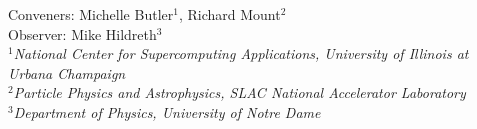 \begin{center}
{\large Conveners: Michelle Butler$^1$,  Richard Mount$^2$\\
  Observer: Mike Hildreth$^3$} \\
\bigskip
$^1${\it National Center for Supercomputing Applications, University of Illinois at Urbana Champaign}\\
$^2${\it Particle Physics and Astrophysics, SLAC National Accelerator Laboratory}\\
$^3${\it Department of Physics, University of Notre Dame }\\
\end{center}
